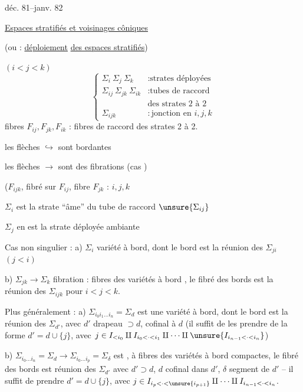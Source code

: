 déc. 81--janv. 82

\uline{Espaces stratifiés et voisinages côniques}

(ou : \uline{déploiement} \uline{des espaces stratifiés})


$(i<j<k)$
\[
\left\{\begin{array}{ll}
\Sigma_i\ \Sigma_j\ \Sigma_k &: \text{strates déployées}\\
\Sigma_{ij}\ \Sigma_{jk}\ \Sigma_{ik} &: \text{tubes de raccord}\\
&\text{des strates 2 à 2}\\
\Sigma_{ijk} &: \text{jonction en }i,j,k
\end{array}\right.
\]
fibres $F_{ij},F_{jk},F_{ik}$ : fibres de raccord
 des strates 2 à 2.

les flèches $\hookrightarrow$ sont bordantes

les flèches $\longrightarrow$ sont des fibrations 
(cas )

($F_{ijk}$, fibré sur $F_{ij}$, fibre $F_{jk}$ : 
 $i,j,k$

$\Sigma_i$ est la strate  ``âme'' du tube de raccord $\unsure{\Sigma_{ij}}$

$\Sigma_j$ en est la strate déployée ambiante

Cas non singulier : a) $\Sigma_i$ variété à bord, dont le bord est
la réunion des $\Sigma_{ji}$ $(j<i)$

b) $\Sigma_{jk}\longrightarrow\Sigma_k$ fibration : fibres des
variétés à bord , le fibré des bords est
la réunion des $\Sigma_{ijk}$ pour $i<j<k$.

Plus généralement : a) $\Sigma_{i_0i_1\ldots i_n}=\Sigma_d$ est une
variété à bord, dont le bord est la réunion des
$\Sigma_{d'}$, avec $d'$ drapeau $\supset d$, cofinal à $d$
(il suffit de les prendre de la forme $d'=d\cup\{j\}$,
avec $j\in I_{<i_0}\amalg I_{i_0<\cdot<i_1}\amalg\cdots\amalg\unsure{I_{i_{n-1}<\cdot<i_n}}$)

b) $\Sigma_{i_0\ldots i_n}=\Sigma_d\longrightarrow\Sigma_{i_0\ldots i_p}=\Sigma_\delta$
est , à fibres des variétés à bord compactes,
le fibré des bords est réunion des $\Sigma_{d'}$
avec $d'\supset d$, $d$ cofinal dans $d'$, $\delta$ segment 
de $d'$ -- il suffit de prendre $d'=d\cup\{j\}$, avec
$j\in I_{i_p<\cdot<\unsure{i_{p+1}}}\amalg\cdots\amalg I_{i_{n-1}<\cdot<i_n}$.

